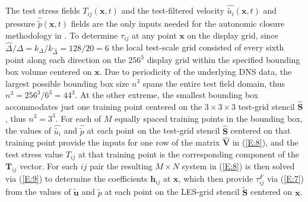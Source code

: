 The test stress fields $T_{ij}(\mathbf{x},t)$  and the test-filtered velocity  $\widehat{\widetilde{u_i}}(\mathbf{x},t)$  and pressure  $\widehat{\widetilde{p}}(\mathbf{x},t)$  fields are the only inputs needed for the autonomic closure methodology in . To determine  $\tau_{ij}$ at any point $\mathbf{x}$ on the display grid, since  $\widehat{\Delta}/\Delta = k_{\Delta}/k_{\widehat{\Delta}} = 128/20 = 6$   the local test-scale grid consisted of every sixth point along each direction on the $256^3$ display grid within the specified bounding box volume centered on $\mathbf{x}$. Due to periodicity of the underlying DNS data, the largest possible bounding box size $n^3$ spans the entire test field domain, thus  $n^3 = 256^3/6^3 = 44^3$. At the other extreme, the smallest bounding box accommodates just one training point centered on the  $3 \times 3 \times 3$ test-grid stencil $\widehat{\mathbf{S}}$, thus $n^3 = 3^3$. For each of $M$ equally spaced training points in the bounding box, the values of $\widehat{\widetilde{u_i}}$  and  $\widehat{\widetilde{p}}$ at each point on the test-grid stencil $\widehat{\mathbf{S}}$  centered on that training point provide the inputs for one row of the matrix $\widehat{\mathbf{V}}$  in (\ref{E:8}), and the test stress value  $T_{ij}$ at that training point is the corresponding component of the  $\mathbf{T}_{ij}$ vector. For each $ij$ pair the resulting $M \times N$  system in (\ref{E:8}) is then solved via (\ref{E:9}) to determine the coefficients $\mathbf{h}_{ij}$  at $\mathbf{x}$, which then provide $\tau_{ij}^{F}$   via (\ref{E:7}) from the values of $\widetilde{\mathbf{u}}$  and $\widetilde{p}$   at each point on the LES-grid stencil $\widetilde{\mathbf{S}}$  centered on $\mathbf{x}$.  
%
%

